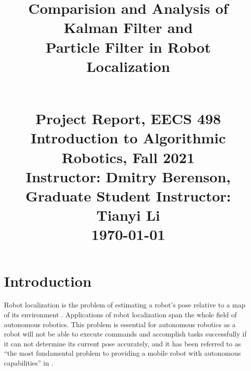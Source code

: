 \documentclass[conference,onecolumn]{IEEEtran}
\begin{document}
\title{Comparision and Analysis of Kalman Filter and \\ Particle Filter in Robot Localization \\

\author{
\and
{}



}\\

{\normalsize Project Report, EECS 498 Introduction to Algorithmic Robotics, Fall 2021}\\
{\normalsize Instructor: Dmitry Berenson, Graduate Student Instructor: Tianyi Li}\\
{\normalsize {\AdvanceDate[-1]\today} }
}
\maketitle




\section{Introduction}


Robot localization is the problem of estimating a robot’s pose relative to a map of its environment \cite{DBLP:books/sp/01/FoxTBD01, DBLP:journals/trob/BetkeG97}.
Applications of robot localization span the whole field of autonomous robotics. This problem is essential for autonomous robotics as a robot will not be able to execute commands and accomplish tasks successfully if it can not determine its current pose accurately, and it has been referred to as “the most fundamental problem to providing a mobile robot with autonomous capabilities” in \cite{DBLP:journals/trob/Cox91}. 
\end{document}
